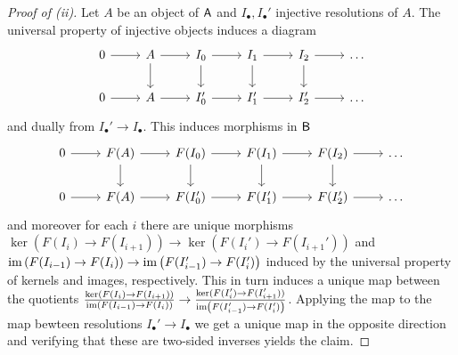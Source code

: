 \begin{proof}[Proof of (ii)]
    Let $A$ be an object of $\mathsf{A}$ and $I_{\bullet},I_{\bullet}'$ injective resolutions of $A$. The universal property of injective objects induces a diagram 
    $$%
    \begin{tikzcd}
        0 & A & {I_{0}} & {I_{1}} & {I_{2}} & \dots \\
        0 & A & {I_{0}'} & {I_{1}'} & {I_{2}'} & \dots
        \arrow[from=1-1, to=1-2]
        \arrow[from=1-2, to=1-3]
        \arrow[from=1-2, to=2-2]
        \arrow[from=1-3, to=1-4]
        \arrow[from=1-3, to=2-3]
        \arrow[from=1-4, to=1-5]
        \arrow[from=1-4, to=2-4]
        \arrow[from=1-5, to=1-6]
        \arrow[from=1-5, to=2-5]
        \arrow[from=2-1, to=2-2]
        \arrow[from=2-2, to=2-3]
        \arrow[from=2-3, to=2-4]
        \arrow[from=2-4, to=2-5]
        \arrow[from=2-5, to=2-6]
    \end{tikzcd}$$
    and dually from $I_{\bullet}'\to I_{\bullet}$. This induces morphisms in $\mathsf{B}$
    $$%
    \begin{tikzcd}
        0 & {F(A)} & {F(I_{0})} & {F(I_{1})} & {F(I_{2})} & \dots \\
        0 & {F(A)} & {F(I_{0}')} & {F(I_{1}')} & {F(I_{2}')} & \dots
        \arrow[from=1-1, to=1-2]
        \arrow[from=1-2, to=1-3]
        \arrow[from=1-2, to=2-2]
        \arrow[from=1-3, to=1-4]
        \arrow[from=1-3, to=2-3]
        \arrow[from=1-4, to=1-5]
        \arrow[from=1-4, to=2-4]
        \arrow[from=1-5, to=1-6]
        \arrow[from=1-5, to=2-5]
        \arrow[from=2-1, to=2-2]
        \arrow[from=2-2, to=2-3]
        \arrow[from=2-3, to=2-4]
        \arrow[from=2-4, to=2-5]
        \arrow[from=2-5, to=2-6]
    \end{tikzcd}$$
    and moreover for each $i$ there are unique morphisms $\ker(F(I_{i})\to F(I_{i+1}))\to\ker(F(I_{i}')\to F(I_{i+1}'))$ and $\mathrm{im}\left(F(I_{i-1})\to F(I_{i})\right)\to\mathrm{im}\left(F(I_{i-1}')\to F(I_{i}')\right)$ induced by the universal property of kernels and images, respectively. This in turn induces a unique map between the quotients $\frac{\ker(F(I_{i})\to F(I_{i+1}))}{\mathrm{im}\left(F(I_{i-1})\to F(I_{i})\right)}\to\frac{\ker(F(I_{i}')\to F(I_{i+1}'))}{\mathrm{im}\left(F(I_{i-1}')\to F(I_{i}')\right)}$. Applying the map to the map bewteen resolutions $I_{\bullet}'\to I_{\bullet}$ we get a unique map in the opposite direction and verifying that these are two-sided inverses yields the claim. 
\end{proof}
